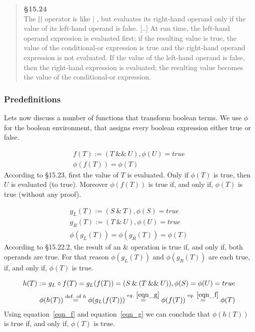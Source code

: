 \documentclass[a4paper,12pt,DIV12]{scrartcl}
\begin{document}
\begin{quote}
\textbf{§15.24}\\
The \textbf{||} operator is like | , but evaluates its right-hand operand only if the value of its left-hand operand is false. [..] At run time, the left-hand operand expression is evaluated first; if the resulting value is true, the value of the conditional-or expression is true and the right-hand operand expression is not evaluated. If the value of the left-hand operand is false, then the right-hand expression is evaluated; the resulting value becomes the value of the conditional-or expression.
\end{quote}

\subsubsection{Predefinitions}
Lets now discuss a number of functions that transform boolean terms. We use $\phi$ for the boolean environment, that assigns every boolean expression either true or false.

\begin{equation}\label{eqn_f}\begin{split}
f(T) := (T \: \&\& \: U), \phi(U) = true\\
\phi(f(T)) = \phi(T)
\end{split}\end{equation}
According to §15.23, first the value of $T$ is evaluated. Only if $\phi(T)$ is true, then $U$ is evaluated (to true). Moreover $\phi(f(T))$ is true if, and only if, $\phi(T)$ is true (without any proof).

\begin{equation}\label{eqn_g}\begin{split}
g_{L}(T) := (S \:\&\: T), \phi(S) = true\\
g_{R}(T) := (T \:\&\: U), \phi(U) = true\\
\phi(g_{L}(T)) = \phi(g_{R}(T)) = \phi(T)
\end{split}\end{equation}
According to §15.22.2, the result of an \& operation is true if, and only if, both operands are true. For that reason $\phi(g_{L}(T))$ and $\phi(g_{R}(T))$ are each true, if, and only if, $\phi(T)$ is true.

\begin{equation}\label{eqn_h}\begin{split}
h(T) := g_{L} \circ f(T) = g_{L}(f(T)) = (S \: \& \: (T \: \&\& \: U)), \phi(S) = \phi(U) = true\\
\phi(h(T)) \stackrel{\text{def. of $h$}}{=} \phi(g_{L}(f(T))) \stackrel{eq.~\eqref{eqn_g}}{=} \phi(f(T)) \stackrel{eq.~\eqref{eqn_f}}{=} \phi(T)
\end{split}\end{equation}
Using equation~\eqref{eqn_f} and equation~\eqref{eqn_g} we can conclude that $\phi(h(T))$ is true if, and only if, $\phi(T)$ is true.
\end{document}
